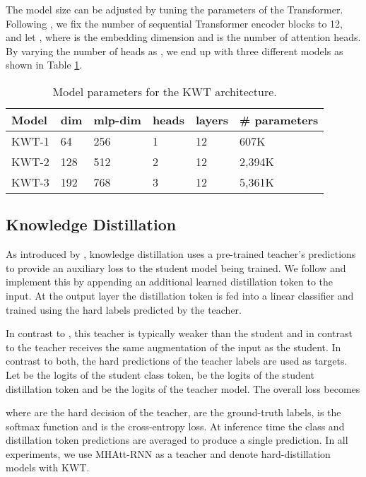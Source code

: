 \documentclass[a4paper]{article}
\begin{document}
The model size can be adjusted by tuning the parameters of the Transformer. Following \cite{touvron2020training}, we fix the number of sequential Transformer encoder blocks to 12, and let , where  is the embedding dimension and  is the number of attention heads. By varying the number of heads as , we end up with three different models as shown in Table \ref{tab:params}.

\begin{table}[t]
	\caption{Model parameters for the KWT architecture.}
	\label{tab:params}
	\centering
	\begin{tabular}{llllll}
	\toprule
	\textbf{Model} & dim & mlp-dim & heads & layers &  \# parameters \\
	\midrule
	KWT-1 & 64 & 256 & 1 & 12 & 607K \\
	KWT-2 & 128 & 512 & 2 & 12 & 2,394K \\
	KWT-3 & 192 & 768 & 3 & 12 & 5,361K \\
	\bottomrule
	\end{tabular}
\end{table}

\subsection{Knowledge Distillation}

As introduced by \cite{hinton2015distill}, knowledge distillation uses a pre-trained teacher's predictions to provide an auxiliary loss to the student model being trained. We follow \cite{touvron2020training} and implement this by appending an additional learned distillation token to the input. At the output layer the distillation token is fed into a linear classifier and trained using the hard labels predicted by the teacher.

In contrast to \cite{hinton2015distill}, this teacher is typically weaker than the student and in contrast to \cite{xie2020student} the teacher receives the same augmentation of the input as the student. In contrast to both, the hard predictions of the teacher labels are used as targets. Let  be the logits of the student class token,  be the logits of the student distillation token and  be the logits of the teacher model. The overall loss becomes

where  are the hard decision of the teacher,  are the ground-truth labels,  is the softmax function and  is the cross-entropy loss. At inference time the class and distillation token predictions are averaged to produce a single prediction. In all experiments, we use MHAtt-RNN as a teacher and denote hard-distillation models with KWT\alembic.
\end{document}
